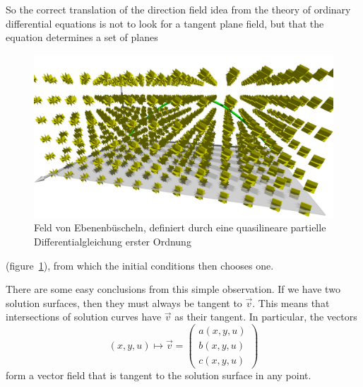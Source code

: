 So the correct translation of the direction field idea from the 
theory of ordinary differential equations is not to look for a tangent
plane field, but that the equation determines a set of planes
\begin{figure}
\begin{center}
\includegraphics[width=\hsize]{../common/3d/planes.jpg}
\end{center}
\caption{Feld von Ebenenbüscheln, definiert durch eine quasilineare
partielle Differentialgleichung erster Ordnung
\label{geometrie:ebenenbueschelfeld}}
\end{figure}
(figure~\ref{geometrie:ebenenbueschelfeld}), from which the initial
conditions then chooses one.

There are some easy conclusions from this simple observation.
If we have two solution surfaces, then they must always be tangent
to $\vec{v}$.
This means that intersections of solution curves have $\vec{v}$ as their
tangent.
In particular, the vectors
\[
(x,y,u)\mapsto
\vec v=
\begin{pmatrix}
a(x,y,u)\\b(x,y,u)\\c(x,y,u)
\end{pmatrix}
\]
form a vector field that is tangent to the solution surface in any point.

